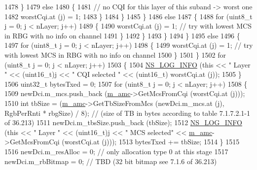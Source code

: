 \begin{DoxyCode}
1478                         \}
1479                       \textcolor{keywordflow}{else}
1480                         \{
1481                           \textcolor{comment}{// no CQI for this layer of this suband -> worst one}
1482                           worstCqi.at (j) = 1;
1483                         \}
1484                     \}
1485                 \}
1486               \textcolor{keywordflow}{else}
1487                 \{
1488                   \textcolor{keywordflow}{for} (uint8\_t j = 0; j < nLayer; j++)
1489                     \{
1490                       worstCqi.at (j) = 1; \textcolor{comment}{// try with lowest MCS in RBG with no info on channel}
1491                     \}
1492                 \}
1493             \}
1494         \}
1495       \textcolor{keywordflow}{else}
1496         \{
1497           \textcolor{keywordflow}{for} (uint8\_t j = 0; j < nLayer; j++)
1498             \{
1499               worstCqi.at (j) = 1; \textcolor{comment}{// try with lowest MCS in RBG with no info on channel}
1500             \}
1501         \}
1502       \textcolor{keywordflow}{for} (uint8\_t j = 0; j < nLayer; j++)
1503         \{
1504           \hyperlink{group__logging_gafbd73ee2cf9f26b319f49086d8e860fb}{NS\_LOG\_INFO} (\textcolor{keyword}{this} << \textcolor{stringliteral}{" Layer "} << (uint16\_t)j << \textcolor{stringliteral}{" CQI selected "} << (uint16\_t)
      worstCqi.at (j));
1505         \}
1506       uint32\_t bytesTxed = 0;
1507       \textcolor{keywordflow}{for} (uint8\_t j = 0; j < nLayer; j++)
1508         \{
1509           newDci.m\_mcs.push\_back (\hyperlink{classns3_1_1FdTbfqFfMacScheduler_a53e0bcb714cd32ee639f7b4e7265087c}{m\_amc}->GetMcsFromCqi (worstCqi.at (j)));
1510           \textcolor{keywordtype}{int} tbSize = (\hyperlink{classns3_1_1FdTbfqFfMacScheduler_a53e0bcb714cd32ee639f7b4e7265087c}{m\_amc}->GetTbSizeFromMcs (newDci.m\_mcs.at (j), RgbPerRnti * rbgSize) / 8); \textcolor{comment}{//
       (size of TB in bytes according to table 7.1.7.2.1-1 of 36.213)}
1511           newDci.m\_tbsSize.push\_back (tbSize);
1512           \hyperlink{group__logging_gafbd73ee2cf9f26b319f49086d8e860fb}{NS\_LOG\_INFO} (\textcolor{keyword}{this} << \textcolor{stringliteral}{" Layer "} << (uint16\_t)j << \textcolor{stringliteral}{" MCS selected"} << 
      \hyperlink{classns3_1_1FdTbfqFfMacScheduler_a53e0bcb714cd32ee639f7b4e7265087c}{m\_amc}->GetMcsFromCqi (worstCqi.at (j)));
1513           bytesTxed += tbSize;
1514         \}
1515 
1516       newDci.m\_resAlloc = 0;  \textcolor{comment}{// only allocation type 0 at this stage}
1517       newDci.m\_rbBitmap = 0; \textcolor{comment}{// TBD (32 bit bitmap see 7.1.6 of 36.213)}

\end{DoxyCode}
